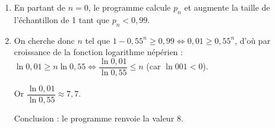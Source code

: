 \documentclass[10pt]{article}
\begin{document}
\begin{enumerate}
\begin{enumerate}
On a $P(X = 0) = \binom{n}{0}\times 0,45^0 \times 0,55^n = 0,55^n$.

Donc $p_n = 1 - P(X = 0) =  1 - 0,55^n$.
		\item












En partant de $n=0$, le programme calcule $p_n$ et augmente la taille de l'échantillon de 1 tant que $p_n < 0,99$.

		\item 
		On cherche donc $n$ tel que $1 - 0,55^n \geqslant 0,99 \iff 0,01 \geqslant 0,55^n$, d'où par croissance de la fonction logarithme népérien : $\ln 0,01 \geqslant n \ln 0,55 \iff \dfrac{\ln 0,01}{\ln 0,55} \leqslant n$ (car $\ln 001 < 0$).
		
		Or $\dfrac{\ln 0,01}{\ln 0,55} \approx 7,7$.
		
Conclusion : le programme renvoie la valeur 8.
	\end{enumerate}
\end{enumerate}

\bigskip
\end{document}
